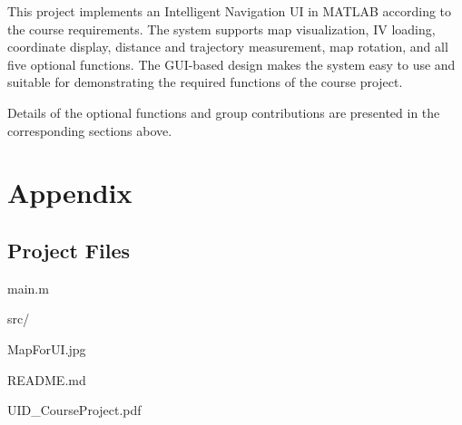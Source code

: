 \documentclass[12pt,a4paper]{ctexart}
\begin{document}
This project implements an Intelligent Navigation UI in MATLAB according to the course requirements. The system supports map visualization, IV loading, coordinate display, distance and trajectory measurement, map rotation, and all five optional functions. The GUI-based design makes the system easy to use and suitable for demonstrating the required functions of the course project.

Details of the optional functions and group contributions are presented in the corresponding sections above.

\section{Appendix}

\subsection{Project Files}

main.m

src/

MapForUI.jpg

README.md

UID\_CourseProject.pdf
\end{document}
